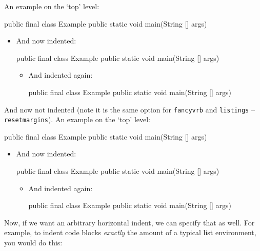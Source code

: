 \documentclass[polish]{article}
\begin{document}
\noindent%
An example on the `top' level:

\begin{javablock}
public final class Example {
	public static void main(String [] args) {
	}
}
\end{javablock}

\begin{itemize}
	\item And now indented:
\begin{javablock}
public final class Example {
	public static void main(String [] args) {
	}
}
\end{javablock}

	\begin{itemize}
		\item And indented again:
\begin{javablock}
public final class Example {
	public static void main(String [] args) {
	}
}
\end{javablock}
	\end{itemize}
\end{itemize}

\bigskip\noindent%
And now not indented (note it is the same option for \texttt{fancyvrb} and \texttt{listings} -- \texttt{resetmargins}).
An example on the `top' level:

\begin{ljavablock}
public final class Example {
	public static void main(String [] args) {
	}
}
\end{ljavablock}

\begin{itemize}
	\item And now indented:
\begin{ljavablock}
public final class Example {
	public static void main(String [] args) {
	}
}
\end{ljavablock}

	\begin{itemize}
		\item And indented again:
\begin{ljavablock}
public final class Example {
	public static void main(String [] args) {
	}
}
\end{ljavablock}
	\end{itemize}
\end{itemize}

\pagebreak
\bigskip\noindent%
Now, if we want an arbitrary horizontal indent, we can specify that as well. For example, to
indent code blocks \emph{exactly} the amount of a typical list environment, you would do this:
\end{document}
